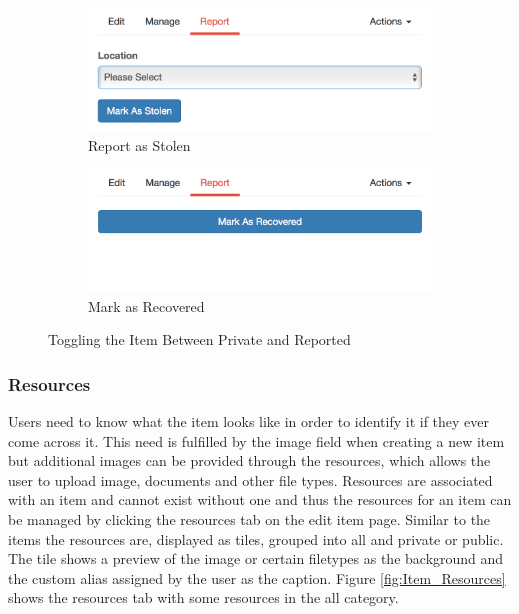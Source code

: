 \begin{figure}[H]
	\centering
	\begin{subfigure}[t]{0.45\textwidth}
		\centering
		\includegraphics[width=1.0\textwidth]{images/Frisk/Report_Stolen}
		\caption{Report as Stolen}\label{fig:Report_Stolen}		
	\end{subfigure}
	\quad
	\begin{subfigure}[t]{0.45\textwidth}
		\centering
		\includegraphics[width=1.0\textwidth]{images/Frisk/Report_Recovered}
		\caption{Mark as Recovered}\label{fig:Report_Recovered}
	\end{subfigure}
	\caption{Toggling the Item Between Private and Reported}\label{fig:Notifications}
\end{figure}

\subsubsection{Resources}

Users need to know what the item looks like in order to identify it if they ever come across it. This need is fulfilled by the image field when creating a new item but additional images can be provided through the resources, which allows the user to upload image, documents and other file types. Resources are associated with an item and cannot exist without one and thus the resources for an item can be managed by clicking the resources tab on the edit item page. Similar to the items the resources are, displayed as tiles, grouped into all and private or public. The tile shows a preview of the image or certain filetypes as the background and the custom alias assigned by the user as the caption. Figure \ref{fig:Item_Resources} shows the resources tab with some resources in the all category.

